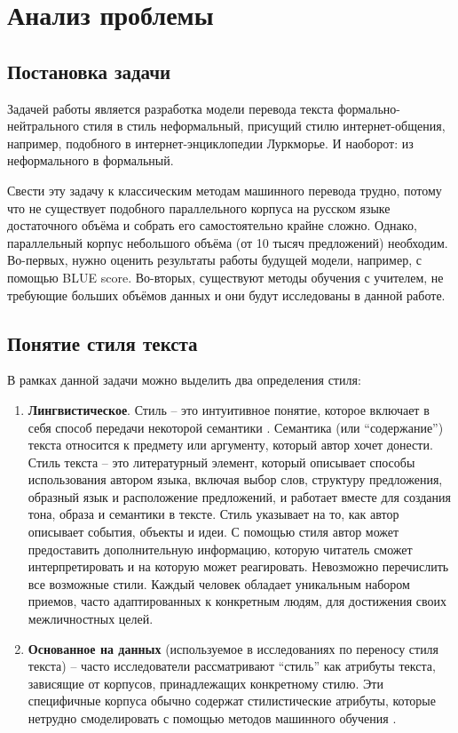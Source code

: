 \chapter{Анализ проблемы} \label{cha:analysis}

\section{Постановка задачи} \label{cha:analysis:sec:target}
Задачей работы является разработка модели перевода текста формально-нейтрального стиля в стиль неформальный, присущий стилю интернет-общения, например, подобного в интернет-энциклопедии Луркморье. И наоборот: из неформального в формальный.

Свести эту задачу к классическим методам машинного перевода трудно, потому что не существует подобного параллельного корпуса на русском языке достаточного объёма и собрать его самостоятельно крайне сложно.
Однако, параллельный корпус небольшого объёма (от 10 тысяч предложений) необходим. Во-первых, нужно оценить результаты работы будущей модели, например, с помощью BLUE score. Во-вторых, существуют методы обучения с учителем, не требующие больших объёмов данных и они будут исследованы в данной работе.

\section{Понятие стиля текста}
В рамках данной задачи можно выделить два определения стиля:
\begin{enumerate}
    \item \textbf{Лингвистическое}. Стиль -- это интуитивное понятие, которое включает в себя способ передачи некоторой семантики \cite{mcdonald-pustejovsky-1985-computational}. 
    Семантика (или "`содержание"') текста относится к предмету или аргументу, который автор хочет донести.
    Стиль текста -- это литературный элемент, который описывает способы использования автором языка, включая выбор слов, структуру предложения, образный язык и расположение предложений, и работает вместе для создания тона, образа и семантики в тексте. Стиль указывает на то, как автор описывает события, объекты и идеи. С помощью стиля автор может предоставить дополнительную информацию, которую читатель сможет интерпретировать и на которую может реагировать.
    Невозможно перечислить все возможные стили. Каждый человек обладает уникальным набором приемов, часто адаптированных к конкретным людям, для достижения своих межличностных целей.
    \item \textbf{Основанное на данных} (используемое в исследованиях по переносу стиля текста) -- часто исследователи рассматривают "`стиль"' как атрибуты текста, зависящие от корпусов, принадлежащих конкретному стилю. Эти специфичные корпуса обычно содержат стилистические атрибуты, которые нетрудно смоделировать с помощью методов машинного обучения \cite{jin2021deep}.
\end{enumerate}

